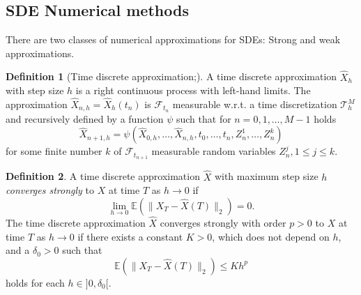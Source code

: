 \documentclass[12pt]{article}
\theoremstyle{definition}
\newtheorem{definition}[definition]{Definition}
\numberwithin{equation}{section}
\newcommand{\norm}[1]{\lVert{#1}\rVert_2}
\begin{document}
\subsection{SDE Numerical methods}
\label{subsec:SdeNumericalMethods}
There are two classes of numerical approximations for SDEs: Strong and weak approximations. 
\begin{definition}[Time discrete approximation;]
  A time discrete approximation $\widehat{X}_h$ with step size $h$ is a right continuous process with left-hand limits. The approximation $\widehat{X}_{n,h} = \widehat{X}_h(t_n)$ is $\mathcal{F}_{t_n}$ measurable w.r.t. a time discretization $\mathcal{T}^M_h$ and recursively defined by a function $\psi$ such that for $n=0,1,\dots,M-1$ holds
  \begin{equation}
    \widehat{X}_{n+1, h} = \psi(\widehat{X}_{0,h}, \dots, \widehat{X}_{n,h}, t_0, \dots, t_n, Z^1_n,\dots, Z_n^k)
  \end{equation}
  for some finite number $k$ of $\mathcal{F}_{t_{n+1}}$ measurable random variables $Z^j_n, 1 \leq j \leq k$.
\end{definition}
\begin{definition}
  A time discrete approximation $\widehat{X}$ with maximum step size $h$ \emph{converges strongly} to $X$ at time $T$ as $h \rightarrow 0$ if 
  \begin{equation}
    \lim_{h \rightarrow 0} \mathbb{E}(\norm{X_T - \widehat{X}(T)}) = 0.
  \end{equation}
  The time discrete approximation $\widehat{X}$ converges strongly with order $p>0$ to $X$ at time $T$ as $h \rightarrow 0$ if there exists a constant $K > 0$, which does not depend on $h$, and a $\delta_0 > 0$ such that 
  \begin{equation}
    \mathbb{E}(\norm{X_T - \widehat{X}(T)}) \leq K h^p
  \end{equation}
  holds for each $h \in ]0, \delta_0[$.
\end{definition}
\end{document}
